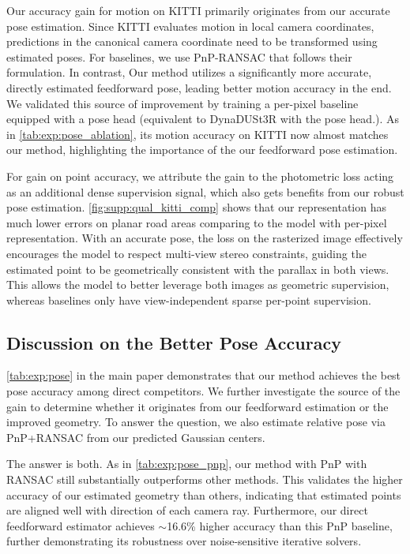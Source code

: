 Our accuracy gain for motion on KITTI primarily originates from our accurate pose estimation.
Since KITTI evaluates motion in local camera coordinates, predictions in the canonical camera coordinate need to be transformed using estimated poses.
For baselines, we use PnP-RANSAC that follows their formulation.
In contrast, Our method utilizes a significantly more accurate, directly estimated feedforward pose, leading better motion accuracy in the end.
We validated this source of improvement by training a per-pixel baseline equipped with a pose head (\ie equivalent to DynaDUSt3R with the pose head.).
As in \cref{tab:exp:pose_ablation}, its motion accuracy on KITTI now almost matches our method, highlighting the importance of the our feedforward pose estimation.

For gain on point accuracy, we attribute the gain to the photometric loss acting as an additional dense supervision signal, which also gets benefits from our robust pose estimation.
\cref{fig:supp:qual_kitti_comp} shows that our representation has much lower errors on planar road areas comparing to the model with per-pixel representation.
With an accurate pose, the loss on the rasterized image effectively encourages the model to respect multi-view stereo constraints, guiding the estimated point to be geometrically consistent with the parallax in both views.
This allows the model to better leverage both images as geometric supervision, whereas baselines only have view-independent sparse per-point supervision.


\subsection{Discussion on the Better Pose Accuracy}
\label{sec:supp:pose_pnp}

\cref{tab:exp:pose} in the main paper demonstrates that our method achieves the best pose accuracy among direct competitors.
We further investigate the source of the gain to determine whether it originates from our feedforward estimation or the improved geometry. 
To answer the question, we also estimate relative pose via PnP+RANSAC from our predicted Gaussian centers.

The answer is both. As in \cref{tab:exp:pose_pnp}, our method with PnP with RANSAC still substantially outperforms other methods.
This validates the higher accuracy of our estimated geometry than others, indicating that estimated points are aligned well with direction of each camera ray.
Furthermore, our direct feedforward estimator achieves $\sim$16.6\% higher accuracy than this PnP baseline, further demonstrating its robustness over noise-sensitive iterative solvers.

